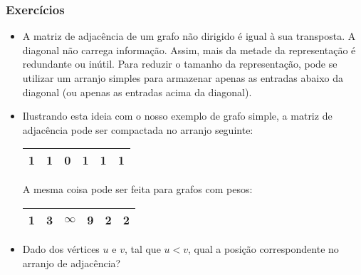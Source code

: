 \documentclass{beamer}
\begin{document}
\begin{frame}

\frametitle{Exercícios}

\begin{itemize}
\item A matriz de adjacência de um grafo não dirigido é igual à sua
  transposta.  A diagonal não carrega informação. Assim, mais da
  metade da representação é redundante ou inútil. Para reduzir o
  tamanho da representação, pode se utilizar um arranjo simples para
  armazenar apenas as entradas abaixo da diagonal (ou apenas as
  entradas acima da diagonal).

\item Ilustrando esta ideia com o nosso exemplo de grafo simple, a
  matriz de adjacência pode ser compactada no arranjo seguinte:
  \begin{center}
  \begin{tabular}{|c|c|c|c|c|c|}
    \hline
    1 & 1 & 0 & 1 & 1 & 1 \\
    \hline
  \end{tabular}
  \end{center}

  A mesma coisa pode ser feita para grafos com pesos:
  \begin{center}
  \begin{tabular}{|c|c|c|c|c|c|}
    \hline
    1 & 3 & $\infty$ & 9 & 2 & 2 \\
    \hline
  \end{tabular}
  \end{center}

\item Dado dos vértices $u$ e $v$, tal que $u < v$, qual a posição
  correspondente no arranjo de adjacência?
\end{itemize}

\end{frame}
\end{document}
